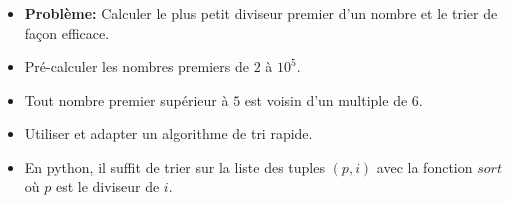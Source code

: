 \begin{frame}
    \frametitle{\problemtitle}
    \begin{itemize}
        \item<+-> \textbf{Problème:} Calculer le plus petit diviseur premier d'un nombre et le trier de façon efficace.
        \item<+-> Pré-calculer les nombres premiers de $2$ à $10^5$.
        \item<+-> Tout nombre premier supérieur à $5$ est voisin d'un multiple de $6$.
        \item<+-> Utiliser et adapter un algorithme de tri rapide.
        \item<+-> En python, il suffit de trier sur la liste des tuples $(p, i)$ avec la fonction $sort$ où $p$ est le diviseur de $i$.

    \end{itemize}
\end{frame}
